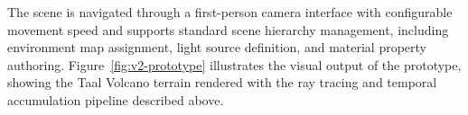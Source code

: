 The scene is navigated through a first-person camera interface with configurable movement speed and supports standard scene hierarchy management, including environment map assignment, light source definition, and material property authoring. Figure~\ref{fig:v2-prototype} illustrates the visual output of the prototype, showing the Taal Volcano terrain rendered with the ray tracing and temporal accumulation pipeline described above.

